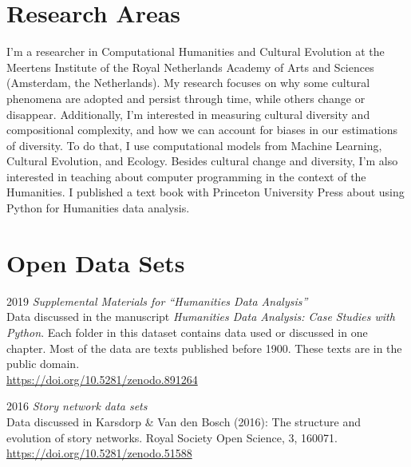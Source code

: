 \documentclass[12pt,letterpaper]{report}
\begin{document}
\section*{Research Areas}

I’m a researcher in Computational Humanities and Cultural Evolution at the Meertens
Institute of the Royal Netherlands Academy of Arts and Sciences (Amsterdam, the
Netherlands). My research focuses on why some cultural phenomena are adopted and persist
through time, while others change or disappear. Additionally, I’m interested in measuring
cultural diversity and compositional complexity, and how we can account for biases in our
estimations of diversity. To do that, I use computational models from Machine Learning,
Cultural Evolution, and Ecology. Besides cultural change and diversity, I’m also
interested in teaching about computer programming in the context of the Humanities. I
published a text book with Princeton University Press about using Python for Humanities
data analysis.

\nocite{*}
\printbibliography[title=Publications, heading=subbibliography]

\section*{Open Data Sets}
\begin{tablist}
\item[2019] \tab{}\textit{Supplemental Materials for ``Humanities Data Analysis''}\\ Data
  discussed in the manuscript \textit{Humanities Data Analysis: Case Studies with Python}.
  Each folder in this dataset contains data used or discussed in one chapter. Most of the
  data are texts published before 1900. These texts are in the public domain. \\
  \url{https://doi.org/10.5281/zenodo.891264}
\item[2016] \tab{}\textit{Story network data sets} \\
  Data discussed in Karsdorp \& Van den Bosch (2016): The structure and evolution of story
  networks. Royal Society Open Science, 3, 160071.
  \url{https://doi.org/10.5281/zenodo.51588} 
\end{tablist}
\end{document}

